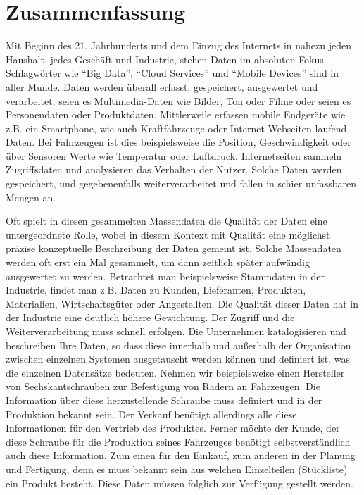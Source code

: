 \chapter*{Zusammenfassung}


Mit Beginn des 21. Jahrhunderts und dem Einzug des Internets in nahezu jeden Haushalt, jedes Geschäft und Industrie, stehen Daten im absoluten Fokus. Schlagwörter wie \enquote{Big Data}, \enquote{Cloud Services} und \enquote{Mobile Devices} sind in aller Munde. Daten werden überall erfasst, gespeichert, ausgewertet und verarbeitet, seien es Multimedia-Daten wie Bilder, Ton oder Filme oder seien es Personendaten oder Produktdaten. Mittlerweile erfassen mobile Endgeräte wie z.B. ein Smartphone, wie auch Kraftfahrzeuge oder Internet Webseiten laufend Daten. Bei Fahrzeugen ist dies beispielsweise die Position, Geschwindigkeit oder über Sensoren Werte wie Temperatur oder Luftdruck. Internetseiten sammeln Zugriffsdaten und analysieren das Verhalten der Nutzer. Solche Daten werden gespeichert, und gegebenenfalls weiterverarbeitet und fallen in schier unfassbaren Mengen an. 

Oft spielt in diesen gesammelten Massendaten die Qualität der Daten eine untergeordnete Rolle, wobei in diesem Kontext mit Qualität eine möglichst präzise konzeptuelle Beschreibung der Daten gemeint ist. Solche Massendaten werden oft erst ein Mal gesammelt, um dann zeitlich später aufwändig ausgewertet zu werden.
Betrachtet man beispielsweise Stammdaten in der Industrie, findet man z.B. Daten zu Kunden, Lieferanten, Produkten, Materialien, Wirtschaftsgüter oder Angestellten. Die Qualität dieser Daten hat in der Industrie eine deutlich höhere Gewichtung. Der Zugriff und die Weiterverarbeitung muss schnell erfolgen. Die Unternehmen katalogisieren und beschreiben Ihre Daten, so dass diese innerhalb und außerhalb der Organisation zwischen einzelnen Systemen ausgetauscht werden können und definiert ist, was die einzelnen Datensätze bedeuten. Nehmen wir beispielsweise einen Hersteller von Sechskantschrauben zur Befestigung von Rädern an Fahrzeugen. Die Information über diese herzustellende Schraube muss definiert und in der Produktion bekannt sein. Der Verkauf benötigt allerdings alle diese Informationen für den Vertrieb des Produktes. Ferner möchte der Kunde, der diese Schraube für die Produktion seines Fahrzeuges benötigt selbstverständlich auch diese Information. Zum einen für den Einkauf, zum anderen in der Planung und Fertigung, denn es muss bekannt sein aus welchen Einzelteilen (Stückliste) ein Produkt besteht. Diese Daten müssen folglich zur Verfügung gestellt werden. 

